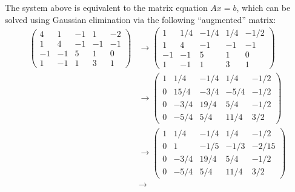 
The system above is equivalent to the matrix equation $Ax = b$, which can be solved using Gaussian elimination via the following ``augmented'' matrix:
\begin{align}
    \label{eq:A-b}
    \begin{pmatrix}
        4 & 1 & -1 & 1 & -2 \\
        1 & 4 & -1 & -1 & -1 \\
        -1 & -1 & 5 & 1 & 0 \\
        1 & -1 & 1 & 3 & 1
    \end{pmatrix}
    &\rightarrow
    \begin{pmatrix}
        1 & 1/4 & -1/4 & 1/4 & -1/2 \\
        1 & 4 & -1 & -1 & -1 \\
        -1 & -1 & 5 & 1 & 0 \\
        1 & -1 & 1 & 3 & 1
    \end{pmatrix}
    \\
    &\rightarrow
    \begin{pmatrix}
        1 & 1/4 & -1/4 & 1/4 & -1/2 \\
        0 & 15/4 & -3/4 & -5/4 & -1/2 \\
        0 & -3/4 & 19/4 & 5/4 & -1/2 \\
        0 & -5/4 & 5/4 & 11/4 & 3/2
    \end{pmatrix}
    \\
    &\rightarrow
    \begin{pmatrix}
        1 & 1/4 & -1/4 & 1/4 & -1/2 \\
        0 & 1 & -1/5 & -1/3 & -2/15 \\
        0 & -3/4 & 19/4 & 5/4 & -1/2 \\
        0 & -5/4 & 5/4 & 11/4 & 3/2
    \end{pmatrix}
    \\
    &\rightarrow

\end{align}

